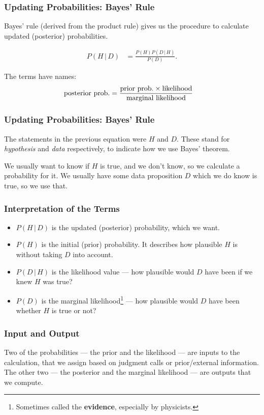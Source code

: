 \documentclass{beamer}
\newcommand{\given}{\,|\,}
\begin{document}
\begin{frame}
\frametitle{Updating Probabilities: Bayes' Rule}
Bayes' rule (derived from the product rule) gives us the procedure to
calculate updated (posterior) probabilities.

\begin{align}
P(H \given D) &= \frac{P(H) P(D\given H)}{P(D)}.
\end{align}

\pause
The terms have names:
\begin{align}
\textnormal{posterior prob.} &=
        \frac{\textnormal{prior prob.} \times \textnormal{likelihood}}{\textnormal{marginal likelihood}}
\end{align}

\end{frame}



\begin{frame}
\frametitle{Updating Probabilities: Bayes' Rule}
The statements in the previous equation were $H$ and $D$.
These stand for {\em hypothesis} and {\em data} respectively,
to indicate how we use Bayes' theorem.\\[0.5em]\pause

We usually want to know if $H$ is true, and we don't know,
so we calculate a probability for it. We usually have some
data proposition $D$ which we do know is true, so we use that.

\end{frame}


\begin{frame}
\frametitle{Interpretation of the Terms}

\begin{itemize}
\item $P(H\given D)$ is the updated (posterior) probability, which we
want.\pause
\item $P(H)$ is the initial (prior) probability. It describes
how plausible $H$ is without taking $D$ into account.\pause
\item $P(D \given H)$ is the likelihood value --- how plausible would $D$
have been if we knew $H$ was true?\pause
\item $P(D)$ is the marginal likelihood\footnote{Sometimes called the
{\bf evidence}, especially by physicists.} --- how plausible would $D$ have been
whether $H$ is true or not?
\end{itemize}

\end{frame}


\begin{frame}
\frametitle{Input and Output}
Two of the probabilities --- the prior and the likelihood --- are inputs to
the calculation, that we assign based on judgment calls or prior/external
information.\\

The other two --- the posterior and the marginal likelihood --- are outputs
that we compute.
\end{frame}
\end{document}

